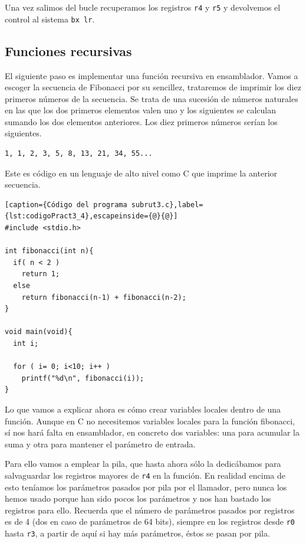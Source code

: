 Una vez salimos del bucle recuperamos los registros {\tt r4} y {\tt r5} y devolvemos el control
al sistema {\tt bx lr}.

\subsection{Funciones recursivas}

El siguiente paso es implementar una función recursiva en ensamblador. Vamos a escoger la 
secuencia de Fibonacci por su sencillez, trataremos de imprimir los diez primeros números
de la secuencia. Se trata de una sucesión de números naturales en las que los dos primeros
elementos valen uno y los siguientes se calculan sumando los dos elementos anteriores.
Los diez primeros números serían los siguientes.

\begin{lstlisting}
1, 1, 2, 3, 5, 8, 13, 21, 34, 55...
\end{lstlisting}

Este es código en un lenguaje de alto nivel como C que imprime la anterior secuencia.

\begin{lstlisting}[caption={Código del programa subrut3.c},label={lst:codigoPract3_4},escapeinside={@}{@}]
#include <stdio.h>

int fibonacci(int n){
  if( n < 2 )
    return 1;
  else
    return fibonacci(n-1) + fibonacci(n-2);
}

void main(void){
  int i;

  for ( i= 0; i<10; i++ )
    printf("%d\n", fibonacci(i));
}
\end{lstlisting}

Lo que vamos a explicar ahora es cómo crear variables locales dentro de una función. Aunque en
C no necesitemos variables locales para la función fibonacci, sí nos hará falta en ensamblador,
en concreto dos variables: una para acumular la suma y otra para mantener el parámetro de entrada.

Para ello vamos a emplear la pila, que hasta ahora sólo la dedicábamos para salvaguardar los
registros mayores de {\tt r4} en la función. En realidad encima de esto teníamos los parámetros
pasados por pila por el llamador, pero nunca los hemos usado porque han sido pocos los parámetros y
nos han bastado los registros para ello. Recuerda que el número de parámetros pasados por registros
es de 4 (dos en caso de parámetros de 64 bits), siempre en los registros desde {\tt r0} hasta
{\tt r3}, a partir de aquí si hay más parámetros, éstos se pasan por pila.

